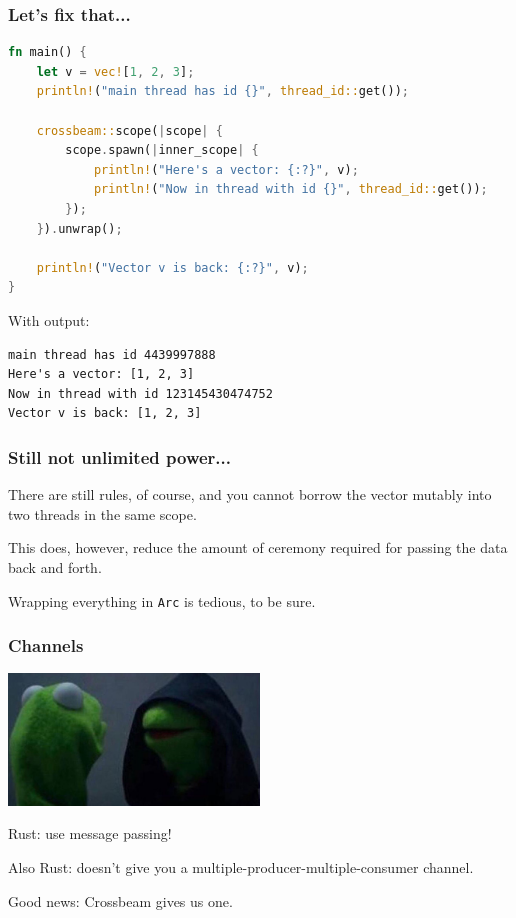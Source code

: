 \begin{frame}[fragile]
\frametitle{Let's fix that...}

\begin{lstlisting}[language=Rust]
fn main() {
    let v = vec![1, 2, 3];
    println!("main thread has id {}", thread_id::get());

    crossbeam::scope(|scope| {
        scope.spawn(|inner_scope| {
            println!("Here's a vector: {:?}", v);
            println!("Now in thread with id {}", thread_id::get());
        });
    }).unwrap();

    println!("Vector v is back: {:?}", v);
}
\end{lstlisting}
With output:

{\scriptsize 
\begin{verbatim}
main thread has id 4439997888
Here's a vector: [1, 2, 3]
Now in thread with id 123145430474752
Vector v is back: [1, 2, 3]
\end{verbatim}
}



\end{frame}


\begin{frame}
\frametitle{Still not unlimited power...}

There are still rules, of course, and you cannot borrow the vector mutably into two threads in the same scope. 

This does, however, reduce the amount of ceremony required for passing the data back and forth.

Wrapping everything in \texttt{Arc} is tedious, to be sure. 

\end{frame}


\begin{frame}
\frametitle{Channels}

\begin{center}
	\includegraphics[width=0.5\textwidth]{images/kermit.jpg}
\end{center}

Rust: use message passing!

Also Rust: doesn't give you a multiple-producer-multiple-consumer channel. 


Good news: Crossbeam gives us one. 


\end{frame}


